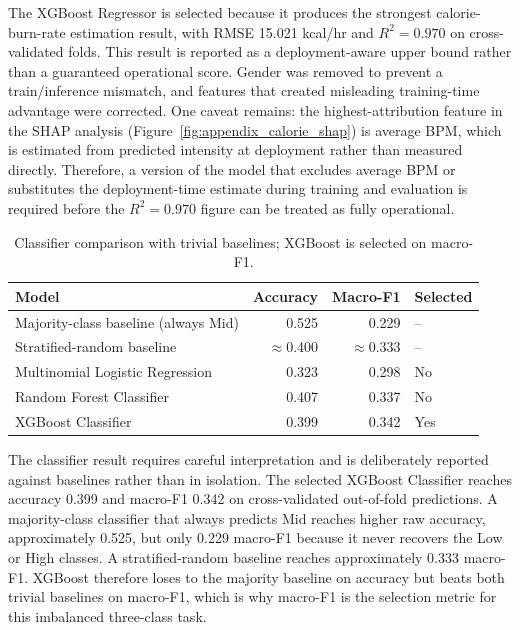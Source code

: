 \documentclass{aitthesis}
\begin{document}
The XGBoost Regressor is selected because it produces the strongest calorie-burn-rate estimation result, with RMSE 15.021 kcal/hr and $R^2=0.970$ on cross-validated folds. This result is reported as a deployment-aware upper bound rather than a guaranteed operational score. Gender was removed to prevent a train/inference mismatch, and features that created misleading training-time advantage were corrected. One caveat remains: the highest-attribution feature in the SHAP analysis (Figure~\ref{fig:appendix_calorie_shap}) is average BPM, which is estimated from predicted intensity at deployment rather than measured directly. Therefore, a version of the model that excludes average BPM or substitutes the deployment-time estimate during training and evaluation is required before the $R^2=0.970$ figure can be treated as fully operational.

\begin{table}[htbp]
\centering
\small
\caption{Classifier comparison with trivial baselines; XGBoost is selected on macro-F1.}
\label{tab:chapter4_classifier_results}
\begin{tabular}{lrrl}
\toprule
\textbf{Model} & \textbf{Accuracy} & \textbf{Macro-F1} & \textbf{Selected} \\
\midrule
Majority-class baseline (always Mid) & 0.525 & 0.229 & -- \\
Stratified-random baseline & $\approx$0.400 & $\approx$0.333 & -- \\
Multinomial Logistic Regression & 0.323 & 0.298 & No \\
Random Forest Classifier & 0.407 & 0.337 & No \\
XGBoost Classifier & 0.399 & 0.342 & Yes \\
\bottomrule
\end{tabular}
\end{table}

The classifier result requires careful interpretation and is deliberately reported against baselines rather than in isolation. The selected XGBoost Classifier reaches accuracy 0.399 and macro-F1 0.342 on cross-validated out-of-fold predictions. A majority-class classifier that always predicts Mid reaches higher raw accuracy, approximately 0.525, but only 0.229 macro-F1 because it never recovers the Low or High classes. A stratified-random baseline reaches approximately 0.333 macro-F1. XGBoost therefore loses to the majority baseline on accuracy but beats both trivial baselines on macro-F1, which is why macro-F1 is the selection metric for this imbalanced three-class task.
\end{document}
